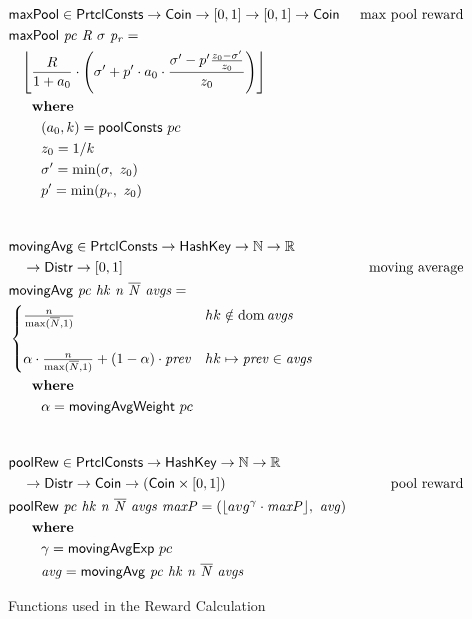 \begin{figure}[htb]
  \begin{align*}
      & \fun{maxPool} \in \PrtclConsts \to \Coin \to [0, 1] \to [0,1] \to \Coin
      & \text{max pool reward} \\
      & \fun{maxPool}~\var{pc}~\var{R}~\sigma~\var{p_r} = \\
      & ~~~\floor*{
           \frac{R}{1 + a_0}
           \cdot
           \left(\sigma' + p'\cdot a_0\cdot\frac{\sigma' - p'\frac{z_0-\sigma'}{z_0}}{z_0}\right)} \\
      & ~~~\where \\
      & ~~~~~~~(a_0, k) = \fun{poolConsts}~pc \\
      & ~~~~~~~z_0 = 1/k \\
      & ~~~~~~~\sigma'=\min(\sigma,~z_0) \\
      & ~~~~~~~p'=\min(p_r,~z_0) \\
      \nextdef
      & \fun{movingAvg} \in \PrtclConsts \to \HashKey \to \mathbb{N} \to \mathbb{R} \\
      & ~~~\to \Distr \to [0, 1]
      & \text{moving average} \\
      & \fun{movingAvg}~\var{pc}~\var{hk}~\var{n}~\var{\overline{N}}~\var{avgs} = \\
      & \begin{cases}
        \frac{n}{\max(\overline{N}, 1)}
        & hk\notin \dom\var{avgs}\\
        \\
          \alpha\cdot\frac{n}{\max(\overline{N}, 1)}+(1-\alpha)\cdot\var{prev}
        & hk\mapsto\var{prev}\in\var{avgs}\\
        \end{cases} \\
      & ~~~\where \\
      & ~~~~~~~\alpha = \fun{movingAvgWeight}~pc \\
      \nextdef
      & \fun{poolRew} \in \PrtclConsts \to \HashKey \to \mathbb{N} \to \mathbb{R} \\
      & ~~~\to \Distr \to \Coin \to (\Coin \times [0, 1])
      & \text{pool reward} \\
      & \fun{poolRew}~\var{pc}~\var{hk}~\var{n}~\var{\overline{N}}~\var{avgs}~\var{maxP} =
      (\floor*{avg^\gamma\cdot \var{maxP}},~\var{avg})\\
      & ~~~\where \\
      & ~~~~~~~\gamma = \fun{movingAvgExp}~pc \\
      & ~~~~~~~\var{avg} = \fun{movingAvg}~\var{pc}~\var{hk}~\var{n}~\var{\overline{N}}~\var{avgs} \\
  \end{align*}
  \caption{Functions used in the Reward Calculation}
  \label{fig:functions:rewards}
\end{figure}

